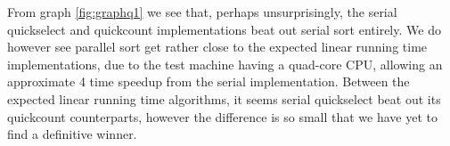 \documentclass[a5paper]{article}
\begin{document}
From graph \ref{fig:graphq1} we see that, perhaps unsurprisingly, the serial quickselect and quickcount implementations beat out serial sort entirely.
We do however see parallel sort get rather close to the expected linear running time implementations, due to the test machine having a quad-core CPU,
allowing an approximate 4 time speedup from the serial implementation. Between the expected linear running time algorithms, it seems serial quickselect 
beat out its quickcount counterparts, however the difference is so small that we have yet to find a definitive winner.

\subsection{}
\end{document}

